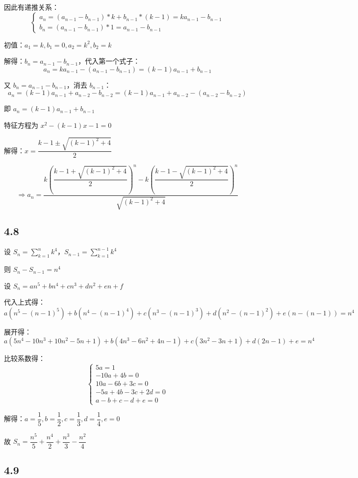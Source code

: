 \documentclass{article}
\begin{document}
因此有递推关系：
\[
\begin{cases}
a_n = (a_{n-1}-b_{n-1})*k + b_{n-1}*(k-1) = ka_{n-1}-b_{n-1} \\
b_n = (a_{n-1}-b_{n-1})*1 = a_{n-1}-b_{n-1}
\end{cases}
\]

初值：$a_1=k,b_1=0,a_2=k^2,b_2=k$

解得：$b_n=a_{n-1}-b_{n-1}$，代入第一个式子：
\[
a_n = ka_{n-1}-(a_{n-1}-b_{n-1}) = (k-1)a_{n-1}+b_{n-1}
\]

又 $b_n=a_{n-1}-b_{n-1}$，消去 $b_{n-1}$：
\[
a_n = (k-1)a_{n-1}+a_{n-2}-b_{n-2} = (k-1)a_{n-1}+a_{n-2}-(a_{n-2}-b_{n-2})
\]

即 $a_n = (k-1)a_{n-1}+b_{n-1}$

特征方程为 $x^2-(k-1)x-1=0$

解得：$x=\dfrac{k-1\pm\sqrt{(k-1)^2+4}}{2}$

\[
\Rightarrow
a_n = \dfrac{k(\dfrac{k-1+\sqrt{(k-1)^2+4}}{2})^n-k(\dfrac{k-1-\sqrt{(k-1)^2+4}}{2})^n}{\sqrt{(k-1)^2+4}}
\]


\subsection*{4.8}

设 $S_n=\sum_{k=1}^n{k^4}$，$S_{n-1}=\sum_{k=1}^{n-1}{k^4}$

则 $S_n-S_{n-1}=n^4$

设 $S_n=an^5+bn^4+cn^3+dn^2+en+f$

代入上式得：$a(n^5-(n-1)^5)+b(n^4-(n-1)^4)+c(n^3-(n-1)^3)+d(n^2-(n-1)^2)+e(n-(n-1))=n^4$

展开得：$a(5n^4-10n^3+10n^2-5n+1)+b(4n^3-6n^2+4n-1)+c(3n^2-3n+1)+d(2n-1)+e=n^4$

比较系数得：
\[
\begin{cases}
5a=1 \\
-10a+4b=0 \\
10a-6b+3c=0 \\
-5a+4b-3c+2d=0 \\
a-b+c-d+e=0
\end{cases}
\]

解得：$a=\dfrac{1}{5},b=\dfrac{1}{2},c=\dfrac{1}{3},d=\dfrac{1}{4},e=0$

故 $S_n=\dfrac{n^5}{5}+\dfrac{n^4}{2}+\dfrac{n^3}{3}-\dfrac{n^2}{4}$

\subsection*{4.9}
\end{document}
